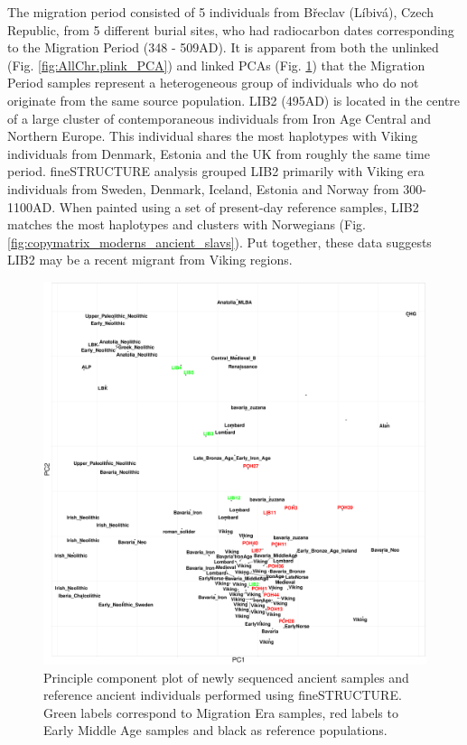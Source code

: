 The migration period consisted of 5 individuals from Břeclav (Líbivá), Czech Republic, from 5 different burial sites, who had radiocarbon dates corresponding to the Migration Period (348 - 509AD). It is apparent from both the unlinked (Fig. \ref{fig:AllChr.plink_PCA}) and linked PCAs (Fig. \ref{fig:fs_PCA}) that the Migration Period samples represent a heterogeneous group of individuals who do not originate from the same source population. LIB2 (495AD) is located in the centre of a large cluster of contemporaneous individuals from Iron Age Central and Northern Europe. This individual shares the most haplotypes with Viking individuals from Denmark, Estonia and the UK from roughly the same time period. fineSTRUCTURE analysis grouped LIB2 primarily with Viking era individuals from Sweden, Denmark, Iceland, Estonia and Norway from 300-1100AD. When painted using a set of present-day reference samples, LIB2 matches the most haplotypes and clusters with Norwegians (Fig. \ref{fig:copymatrix_moderns_ancient_slavs}). Put together, these data suggests LIB2 may be a recent migrant from Viking regions. 

\begin{figure}[htp]
    \centering
    \includegraphics[width=1.0\textwidth]{../images/chapter5/fs_PCA.pdf}
    \caption{Principle component plot of newly sequenced ancient samples and reference ancient individuals performed using fineSTRUCTURE. Green labels correspond to Migration Era samples, red labels to Early Middle Age samples and black as reference populations.}
    \label{fig:fs_PCA}
\end{figure}

